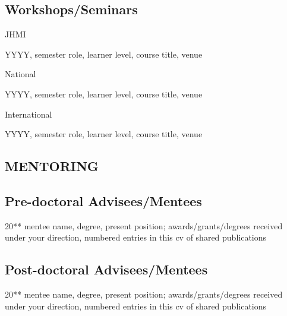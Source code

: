\documentclass[11pt]{article}
\newenvironment{lyxlist}[1]
	{\begin{list}{}
		{\setlength\itemsep{-0.5ex}
		\settowidth{\labelwidth}{#1}
		 \setlength{\leftmargin}{\labelwidth}
		 \addtolength{\leftmargin}{\labelsep}
		 \renewcommand{\makelabel}[1]{##1\hfil}}}
	{\end{list}}
\begin{document}
\subsection*{Workshops/Seminars}
\begin{lyxlist}{2020 (Winter, virtual)}

\item[{\textcolor{color1}{JHMI}}]

\item[{YYYY, semester}]role, learner level, course title, venue

\item[{\textcolor{color1}{National}}]

\item[{YYYY, semester}]role, learner level, course title, venue

\item[{\textcolor{color1}{International}}]
\item[{YYYY, semester}]role, learner level, course title, venue

\end{lyxlist}

\subsection*{MENTORING}
\subsection*{Pre-doctoral Advisees/Mentees}
\begin{lyxlist}{20{*}{*}\textendash 20{*}{*}}
\item[{20{*}{*}\textendash 20{*}{*}}]mentee name, degree, present position; awards/grants/degrees received under your direction, numbered entries in this cv of shared publications
\end{lyxlist}

\subsection*{Post-doctoral Advisees/Mentees}
\begin{lyxlist}{20{*}{*}\textendash 20{*}{*}}
\item[{20{*}{*}\textendash 20{*}{*}}]mentee name, degree, present position; awards/grants/degrees received under your direction, numbered entries in this cv of shared publications
\end{lyxlist}
\end{document}
